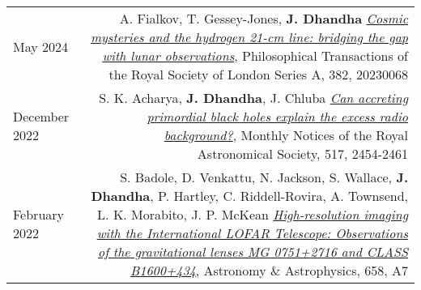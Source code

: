 \documentclass{article}
\begin{document}
\begin{longtable}{L!{\vrule}R}
    May 2024 &
    A. Fialkov, T. Gessey-Jones, \textbf{J. Dhandha}
    \href{https://ui.adsabs.harvard.edu/abs/2024RSPTA.38230068F}{\textit{Cosmic mysteries and the hydrogen 21-cm line: bridging the gap with lunar observations}},
    Philosophical Transactions of the Royal Society of London Series A, 382, 20230068 \\

    December 2022 &
    S. K. Acharya, \textbf{J. Dhandha}, J. Chluba
    \href{https://ui.adsabs.harvard.edu/abs/2022MNRAS.517.2454A}{\textit{Can accreting primordial black holes explain the excess radio background?}},
    Monthly Notices of the Royal Astronomical Society, 517, 2454-2461 \\

    February 2022 &
    S. Badole, D. Venkattu, N. Jackson, S. Wallace, \textbf{J. Dhandha}, P. Hartley, C. Riddell-Rovira, A. Townsend, L. K. Morabito, J. P. McKean
    \href{https://ui.adsabs.harvard.edu/abs/2022A&A...658A...7B}{\textit{High-resolution imaging with the International LOFAR Telescope: Observations of the gravitational lenses MG 0751+2716 and CLASS B1600+434}},
    Astronomy \& Astrophysics, 658, A7 \\
\end{longtable}
\end{document}
